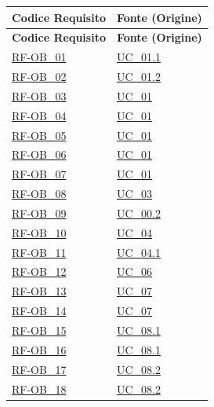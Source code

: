 \renewcommand{\arraystretch}{1.15}
\begin{longtable}{|>{\raggedright}p{}|>{\raggedright\arraybackslash}p{}|}
    \hline
    \rowcolor[gray]{0.9}
    \textbf{Codice Requisito} & \textbf{Fonte (Origine)} \\
    \hline
    \endfirsthead
    
    \hline
    \rowcolor[gray]{0.9}
    \textbf{Codice Requisito} & \textbf{Fonte (Origine)} \\
    \hline
    \endhead

    \hline
    \hyperlink{rf-ob_1}{RF-OB\_01} & \hyperref[uc_01.1]{UC\_01.1} \\ \hline
    \hyperlink{rf-ob_2}{RF-OB\_02} & \hyperref[uc_01.2]{UC\_01.2} \\ \hline
    \hyperlink{rf-ob_3}{RF-OB\_03} & \hyperref[uc_01]{UC\_01} \\ \hline
    \hyperlink{rf-ob_4}{RF-OB\_04} & \hyperref[uc_01]{UC\_01} \\ \hline
    \hyperlink{rf-ob_5}{RF-OB\_05} & \hyperref[uc_01]{UC\_01} \\ \hline
    \hyperlink{rf-ob_6}{RF-OB\_06} & \hyperref[uc_01]{UC\_01} \\ \hline
    \hyperlink{rf-ob_7}{RF-OB\_07} & \hyperref[uc_01]{UC\_01} \\ \hline
    \hyperlink{rf-ob_8}{RF-OB\_08} & \hyperref[uc_03]{UC\_03} \\ \hline
    \hyperlink{rf-ob_9}{RF-OB\_09} & \hyperref[uc_00.2]{UC\_00.2} \\ \hline
    \hyperlink{rf-ob_10}{RF-OB\_10} & \hyperref[uc_04]{UC\_04} \\ \hline
    \hyperlink{rf-ob_11}{RF-OB\_11} & \hyperref[uc_04.1]{UC\_04.1} \\ \hline
    \hyperlink{rf-ob_12}{RF-OB\_12} & \hyperref[uc_06]{UC\_06} \\ \hline
    \hyperlink{rf-ob_13}{RF-OB\_13} & \hyperref[uc_07]{UC\_07} \\ \hline
    \hyperlink{rf-ob_14}{RF-OB\_14} & \hyperref[uc_07]{UC\_07} \\ \hline
    \hyperlink{rf-ob_15}{RF-OB\_15} & \hyperref[uc_08.1]{UC\_08.1} \\ \hline
    \hyperlink{rf-ob_16}{RF-OB\_16} & \hyperref[uc_08.1]{UC\_08.1} \\ \hline
    \hyperlink{rf-ob_17}{RF-OB\_17} & \hyperref[uc_08.2]{UC\_08.2} \\ \hline
    \hyperlink{rf-ob_18}{RF-OB\_18} & \hyperref[uc_08.2]{UC\_08.2} \\ \hline

\end{longtable}
